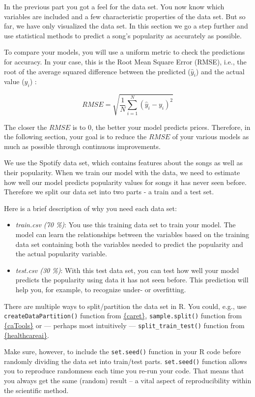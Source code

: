 \documentclass[
  11pt,
]{book}
\newenvironment{tips}[1]
  {
  \begin{itemize}
  \footnotesize
  \renewcommand{\labelitemi}{
    \raisebox{-.7\height}[0pt][0pt]{
      {\setkeys{Gin}{width=3em,keepaspectratio}
        \texttt{[image: images/\#1.png]}}
    }
  }
  \setlength{\fboxsep}{1em}
  \begin{rbox}
  \item
  }
  {
  \end{rbox}
  \end{itemize}
  }
\begin{document}
In the previous part you got a feel for the data set. You now know which variables are included and a few characteristic properties of the data set. But so far, we have only visualized the data set. In this section we go a step further and use statistical methods to predict a song's popularity as accurately as possible.

To compare your models, you will use a uniform metric to check the predictions for accuracy. In your case, this is the Root Mean Square Error (RMSE), i.e., the root of the average squared difference between the predicted (\(\hat{y}_i\)) and the actual value (\(y_i\)) :

\[ RMSE = \sqrt{\frac{1}{N}\sum_{i=1}^{N}{(\hat{y}_i-y_i)^2}} \]

The closer the \(RMSE\) is to 0, the better your model predicts prices. Therefore, in the following section, your goal is to reduce the \(RMSE\) of your various models as much as possible through continuous improvements.

We use the Spotify data set, which contains features about the songs as well as their popularity. When we train our model with the data, we need to estimate how well our model predicts popularity values for songs it has never seen before. Therefore we split our data set into two parts - a train and a test set.

Here is a brief description of why you need each data set:

\begin{itemize}
\item
  \emph{train.csv (70 \%)}: You use this training data set to train your model. The model can learn the relationships between the variables based on the training data set containing both the variables needed to predict the popularity and the actual popularity variable.
\item
  \emph{test.csv (30 \%)}: With this test data set, you can test how well your model predicts the popularity using data it has not seen before. This prediction will help you, for example, to recognize under- or overfitting.
\end{itemize}

\begin{tips}r

There are multiple ways to split/partition the data set in R. You could, e.g., use \texttt{createDataPartition()} function from \href{https://cran.r-project.org/package=caret}{\{caret\}}, \texttt{sample.split()} function from \href{https://cran.r-project.org/package=caTools}{\{caTools\}} or --- perhaps most intuitively --- \texttt{split\_train\_test()} function from \href{https://CRAN.R-project.org/package=healthcareai}{\{healthcareai\}}.

Make sure, however, to include the \texttt{set.seed()} function in your R code before randomly dividing the data set into train/test parts. \texttt{set.seed()} function allows you to reproduce randomness each time you re-run your code. That means that you always get the same (random) result -- a vital aspect of reproducibility within the scientific method.

\end{tips}
\end{document}
